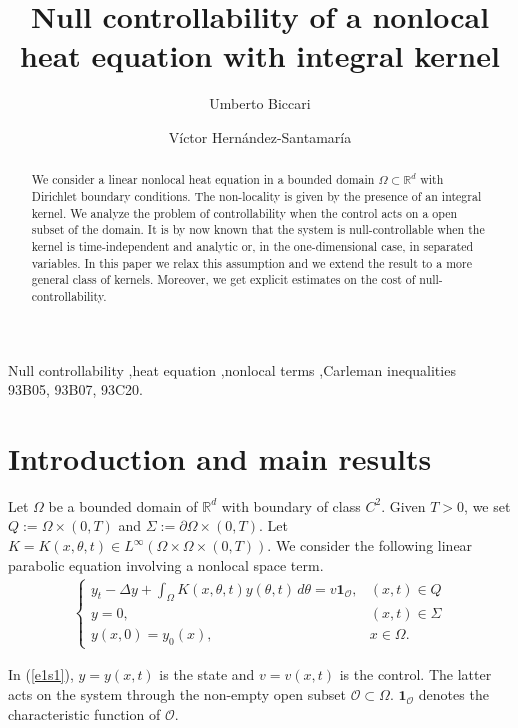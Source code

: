 \documentclass[preprint,1p]{elsarticle}
\title{{\bf Null controllability of a nonlocal heat equation with integral kernel}}
\author[rvt,els]{Umberto Biccari \corref{cor1}}
\author[rvt,els]{V\'ictor Hern\'andez-Santamar\'ia}
\newcommand{\D}{\displaystyle}
\newcommand{\R}{\mathbb{R}}
\begin{document}
           

\begin{abstract}
We consider a linear nonlocal heat equation in a bounded domain $\Omega\subset\R^d$ with Dirichlet boundary conditions. The non-locality is given by the presence of an integral kernel. We analyze the problem of controllability when the control acts on a open subset of the domain. It is by now known that the system is null-controllable when the kernel is time-independent and analytic or, in the one-dimensional case, in separated variables. In this paper we relax this assumption and we extend the result to a more general class of kernels. Moreover, we get explicit estimates on the cost of null-controllability.
\end{abstract}

\begin{keyword}
	Null controllability \sep heat equation \sep nonlocal terms \sep Carleman inequalities
	\\
	\MSC[2010] 93B05, 93B07, 93C20.
\end{keyword}

\maketitle

\section{Introduction and main results}\label{intro_sec}
Let $\Omega$ be a bounded domain of $\R^d$ with boundary of class $C^2$. Given $T>0$, we set $Q:=\Omega\times (0,T)$ and $\Sigma:=\partial\Omega\times (0,T)$. Let $K=K(x,\theta,t)\in L^\infty(\Omega\times\Omega\times(0,T))$.  We consider the following linear parabolic equation involving a nonlocal space term. 
\begin{align}\label{e1s1}
	\begin{cases}
		\D y_t - \Delta y + \int_\Omega K(x,\theta,t)y(\theta,t)\,d\theta = v\mathbf{1}_{\mathcal O}, & (x,t)\in Q
		\\
		y = 0, & (x,t)\in\Sigma
		\\
		y(x,0) = y_0(x), & x\in\Omega.
	\end{cases}
\end{align}

In (\ref{e1s1}), $y=y(x,t)$ is the state and $v=v(x,t)$ is the control. The latter acts on the system through the non-empty open subset ${\mathcal O}\subset\Omega$. $\mathbf{1}_{\mathcal O}$ denotes the characteristic function of $\mathcal O$. 
\end{document}

